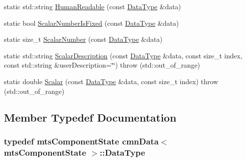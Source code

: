 \begin{DoxyCompactItemize}
\item 
static std\+::string \hyperlink{classcmn_data_3_01mts_component_state_01_4_a60915bde58ad96fe5dfa473aa34d2fc8}{Human\+Readable} (const \hyperlink{classcmn_data_3_01mts_component_state_01_4_a1f90216f34afbed70f7dbd34d33fafde}{Data\+Type} \&data)
\item 
static bool \hyperlink{classcmn_data_3_01mts_component_state_01_4_a1ada527fb863278e5694cffbd7489be8}{Scalar\+Number\+Is\+Fixed} (const \hyperlink{classcmn_data_3_01mts_component_state_01_4_a1f90216f34afbed70f7dbd34d33fafde}{Data\+Type} \&data)
\item 
static size\+\_\+t \hyperlink{classcmn_data_3_01mts_component_state_01_4_a594a12a65ef7e47e0a2a023a4616bf0f}{Scalar\+Number} (const \hyperlink{classcmn_data_3_01mts_component_state_01_4_a1f90216f34afbed70f7dbd34d33fafde}{Data\+Type} \&data)
\item 
static std\+::string \hyperlink{classcmn_data_3_01mts_component_state_01_4_ac5e262aeec4702218e4a2952e2d6c297}{Scalar\+Description} (const \hyperlink{classcmn_data_3_01mts_component_state_01_4_a1f90216f34afbed70f7dbd34d33fafde}{Data\+Type} \&data, const size\+\_\+t index, const std\+::string \&user\+Description=\char`\"{}\char`\"{})  throw (std\+::out\+\_\+of\+\_\+range)
\item 
static double \hyperlink{classcmn_data_3_01mts_component_state_01_4_a8b5ca82082004e09989650f8693f9fac}{Scalar} (const \hyperlink{classcmn_data_3_01mts_component_state_01_4_a1f90216f34afbed70f7dbd34d33fafde}{Data\+Type} \&data, const size\+\_\+t index)  throw (std\+::out\+\_\+of\+\_\+range)
\end{DoxyCompactItemize}


\subsection{Member Typedef Documentation}
\hypertarget{classcmn_data_3_01mts_component_state_01_4_a1f90216f34afbed70f7dbd34d33fafde}{}
\subsubsection[{Data\+Type}]{\setlength{\rightskip}{0pt plus 5cm}typedef {\bf mts\+Component\+State} {\bf cmn\+Data}$<$ {\bf mts\+Component\+State} $>$\+::{\bf Data\+Type}}\label{classcmn_data_3_01mts_component_state_01_4_a1f90216f34afbed70f7dbd34d33fafde}


